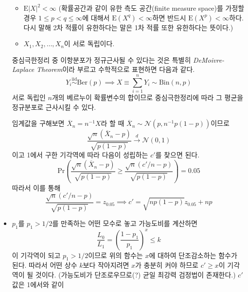 \documentclass[answers]{exam}
\begin{document}
\begin{questions}
\begin{solution}
\begin{itemize}
      \begin{itemize}
        \item $\mathrm{E}\left|X\right|^{2}<\infty$ (확률공간과 같이 유한 측도 공간(finite measure space)를 가정할 경우 $1\leq p<q\leq \infty$에 대해서 $\mathrm{E}\left(X^{q}\right)<\infty$하면 반드시 $\mathrm{E}\left(X^{p}\right)<\infty$하다. 다시 말해 2차 적률이 유한하다는 말은 1차 적률 또한 유한하다는 뜻이다.)
        \item $X_{1},X_{2},\ldots,X_{n}$이 서로 독립이다.
      \end{itemize}
      중심극한정리 중 이항분포가 정규근사될 수 있다는 것은 특별히 \emph{DeMoivre-Laplace Theorem}이라 부르고 수학적으로 표현하면 다음과 같다.
      \begin{equation}
        Y_{i}\overset{\text{iid}}{\sim}\mathrm{Ber}\left(p\right) \implies X \equiv \sum_{i=1}^{n}Y_{i} \sim \mathrm{Bin}\left(n,p\right)
      \end{equation}
      서로 독립인 $n$개의 베르누이 확률변수의 합이므로 중심극한정리에 따라 그 평균을 정규분포로 근사시킬 수 있다. \par
      임계값을 구해보면 $\overline{X}_{n}=n^{-1}X$라 할 때 $\overline{X}_{n} \sim \mathcal{N}\left(p, n^{-1}p\left(1-p\right)\right)$이므로 
      \begin{equation}
        \dfrac{\sqrt{n}\left(\overline{X}_{n}-p\right)}{\sqrt{p\left(1-p\right)}} \xrightarrow{d} \mathcal{N}\left(0,1\right)
      \end{equation}
      이고 1에서 구한 기각역에 따라 다음이 성립하는 $c'$를 찾으면 된다.
      \begin{equation}
        \mathrm{Pr}\left(\dfrac{\sqrt{n}\left(\overline{X}_{n}-p\right)}{\sqrt{p\left(1-p\right)}} \geq \dfrac{\sqrt{n}\left(c'/n-p\right)}{\sqrt{p\left(1-p\right)}}\right) = 0.05
      \end{equation}
      따라서 이를 통해
      \begin{equation}
        \dfrac{\sqrt{n}\left(c'/n-p\right)}{\sqrt{p\left(1-p\right)}} = z_{0.05} \implies c'=\sqrt{np\left(1-p\right)}z_{0.05}+np
      \end{equation}
      \item $p_{1}$를 $p_{1}>1/2$를 만족하는 어떤 모수로 놓고 가능도비를 계산하면
      \begin{equation}
        \dfrac{L_{0}}{L_{1}} = \left(\dfrac{1-p_{1}}{p_{1}}\right)^{x} \leq k
      \end{equation}
      이 기각역이 되고 $p_{1}>1/2$이므로 위의 함수는 $x$에 대하여 단조감소하는 함수가 된다. 따라서 어떤 상수 $k$보다 작아지려면 $x$가 충분히 커야 하므로 $c'\geq x$이 기각역이 될 것이다. (가능도비가 단조로우므로(?) 균일 최강력 검정법이 존재한다.) $c'$값은 1에서와 같이

\end{itemize}
\end{solution}
\end{questions}
\end{document}
